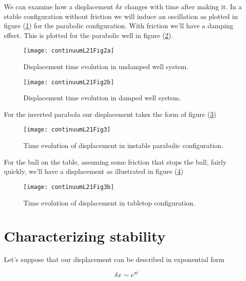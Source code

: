 We can examine how a displacement $\delta x$ changes with time after making it.  In a stable configuration without friction we will induce an oscillation as plotted in figure (\ref{fig:continuumL21:continuumL21Fig2a}) for the parabolic configuration.  With friction we'll have a damping effect.  This is plotted for the parabolic well in figure (\ref{fig:continuumL21:continuumL21Fig2b}).

\begin{figure}[htp]
   \centering
   \texttt{[image: continuumL21Fig2a]}
   \caption{Displacement time evolution in undamped well system.}\label{fig:continuumL21:continuumL21Fig2a}
\end{figure}
\begin{figure}[htp]
   \centering
   \texttt{[image: continuumL21Fig2b]}
   \caption{Displacement time evolution in damped well system.}\label{fig:continuumL21:continuumL21Fig2b}
\end{figure}

For the inverted parabola our displacement takes the form of figure (\ref{fig:continuumL21:continuumL21Fig3})
\begin{figure}[htp]
   \centering
   \texttt{[image: continuumL21Fig3]}
   \caption{Time evolution of displacement in instable parabolic configuration.}\label{fig:continuumL21:continuumL21Fig3}
\end{figure}

For the ball on the table, assuming some friction that stops the ball, fairly quickly, we'll have a displacement as illustrated in figure (\ref{fig:continuumL21:continuumL21Fig3b})
\begin{figure}[htp]
   \centering
   \texttt{[image: continuumL21Fig3b]}
   \caption{Time evolution of displacement in tabletop configuration.}\label{fig:continuumL21:continuumL21Fig3b}
\end{figure}

\section{Characterizing stability}

Let's suppose that our displacement can be described in exponential form

\begin{equation}\label{eqn:continuumL21:10}
\delta x \sim e^{\sigma t}
\end{equation}

